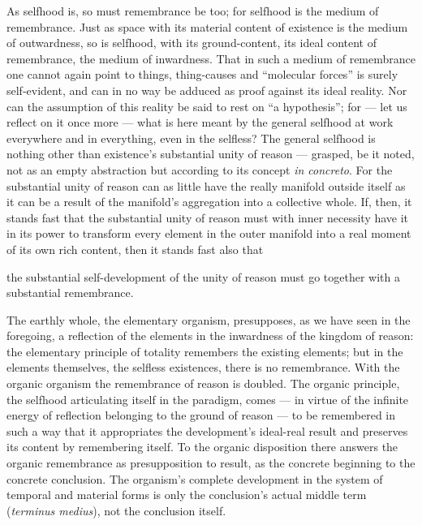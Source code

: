 \documentclass[12pt,a4paper]{book}
\begin{document}
As selfhood is, so must remembrance be too; for selfhood is the medium of
remembrance. Just as space with its material content of existence is the medium
of outwardness, so is selfhood, with its ground-content, its ideal content of
remembrance, the medium of inwardness. That in such a medium of remembrance one
cannot again point to things, thing-causes and ``molecular forces'' is surely
self-evident, and can in no way be adduced as proof against its ideal reality.
Nor can the assumption of this reality be said to rest on ``a hypothesis''; for
--- let us reflect on it once more --- what is here meant by the general
selfhood at work everywhere and in everything, even in the selfless? The general
selfhood is nothing other than existence's substantial unity of reason ---
grasped, be it noted, not as an empty abstraction but according to its concept
\textit{in concreto}. For the substantial unity of reason can as little have the
really manifold outside itself as it can be a result of the manifold's
aggregation into a collective whole. If, then, it stands fast that the
substantial unity of reason must with inner necessity have it in its power to
transform every element in the outer manifold into a real moment of its own rich
content, then it stands fast also that

\setcounter{footnote}{0}
the substantial self-development of the unity of reason must go together with a
substantial remembrance.

The earthly whole, the elementary organism, presupposes, as we have seen in the
foregoing, a reflection of the elements in the inwardness of the kingdom of
reason: the elementary principle of totality remembers the existing elements;
but in the elements themselves, the selfless existences, there is no
remembrance. With the organic organism the remembrance of reason is doubled. The
organic principle, the selfhood articulating itself in the paradigm, comes ---
in virtue of the infinite energy of reflection belonging to the ground of reason
--- to be remembered in such a way that it appropriates the development's
ideal-real result and preserves its content by remembering itself. To the organic
disposition there answers the organic remembrance as presupposition to result, as
the concrete beginning to the concrete conclusion. The organism's complete
development in the system of temporal and material forms is only the
conclusion's actual middle term (\textit{terminus medius}), not the conclusion
itself.
\end{document}
